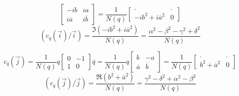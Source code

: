 \begin{enumerate}
\begin{enumerate}
\begin{displaymath}
\begin{bmatrix}
 -ib & ia \\
 i\overline{a} & i\overline{b}
\end{bmatrix} 
= \dfrac{1}{N(q)} 
\begin{bmatrix}
 . & . \\
 -ib^2+i\overline{a}^2 & 0
\end{bmatrix}
\end{displaymath}
\begin{displaymath}
 (c_q(\overrightarrow i)/\overrightarrow i) 
= \dfrac{\Im(-ib^2+i\overline{a}^2)}{N(q)}
=  \dfrac{\alpha^2 -\beta^2 -\gamma^2 +\delta^2}{N(q)}
\end{displaymath}

\begin{displaymath}
c_q(\overrightarrow j) = \dfrac{1}{N(q)} q 
\begin{bmatrix}
 0 & -1 \\
 1 & 0
\end{bmatrix}
\overline{q}
= \dfrac{1}{N(q)} q 
\begin{bmatrix}
 b & -a \\
 \overline{a} & \overline{b}
\end{bmatrix} 
= \dfrac{1}{N(q)} 
\begin{bmatrix}
 . & . \\
 b^2+\overline{a}^2 & 0
\end{bmatrix}
\end{displaymath}
\begin{displaymath}
 (c_q(\overrightarrow j)/\overrightarrow j)
= \dfrac{\Re(b^2+\overline{a}^2)}{N(q)}
= \dfrac{\gamma^2 -\delta^2 +\alpha^2 -\beta^2}{N(q)}
\end{displaymath}


\end{enumerate}
\end{enumerate}
